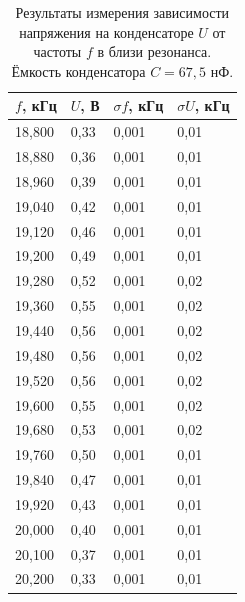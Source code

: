 \documentclass[12pt]{article}
\begin{document}
\begin{table}[H]
    \centering
    \begin{tabular}{|l|l|l|l|}
        \hline
        $f$, кГц & $U$, В & $\sigma f$, кГц & $\sigma U$, кГц \\ \hline
        18,800   & 0,33   & 0,001           & 0,01            \\ \hline
        18,880   & 0,36   & 0,001           & 0,01            \\ \hline
        18,960   & 0,39   & 0,001           & 0,01            \\ \hline
        19,040   & 0,42   & 0,001           & 0,01            \\ \hline
        19,120   & 0,46   & 0,001           & 0,01            \\ \hline
        19,200   & 0,49   & 0,001           & 0,01            \\ \hline
        19,280   & 0,52   & 0,001           & 0,02            \\ \hline
        19,360   & 0,55   & 0,001           & 0,02            \\ \hline
        19,440   & 0,56   & 0,001           & 0,02            \\ \hline
        19,480   & 0,56   & 0,001           & 0,02            \\ \hline
        19,520   & 0,56   & 0,001           & 0,02            \\ \hline
        19,600   & 0,55   & 0,001           & 0,02            \\ \hline
        19,680   & 0,53   & 0,001           & 0,02            \\ \hline
        19,760   & 0,50   & 0,001           & 0,01            \\ \hline
        19,840   & 0,47   & 0,001           & 0,01            \\ \hline
        19,920   & 0,43   & 0,001           & 0,01            \\ \hline
        20,000   & 0,40   & 0,001           & 0,01            \\ \hline
        20,100   & 0,37   & 0,001           & 0,01            \\ \hline
        20,200   & 0,33   & 0,001           & 0,01            \\ \hline
    \end{tabular}
    \caption{Результаты измерения зависимости напряжения на конденсаторе $U$ от частоты $f$ в близи резонанса.
        Ёмкость конденсатора $C = 67,5$ нФ.}
    \label{tab:3}
\end{table}
\end{document}
